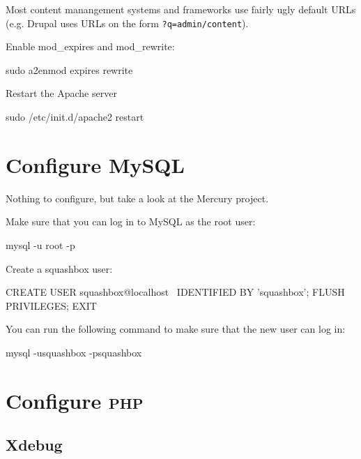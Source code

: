 \documentclass[final,ebook,10pt,twoside,openright]{memoir}
\begin{document}
Most content manangement systems and frameworks use fairly ugly default URLs (e.g. Drupal uses URLs on the form \verb!?q=admin/content!).

Enable mod\_expires and mod\_rewrite:

\begin{squashboxcommand}
sudo a2enmod expires rewrite
\end{squashboxcommand}

Restart the Apache server

\begin{squashboxcommand}
sudo /etc/init.d/apache2 restart
\end{squashboxcommand}

\section{Configure MySQL}
\label{sec:Configure MySQL}

Nothing to configure, but take a look at the Mercury project.

Make sure that you can log in to MySQL as the root user:

\begin{squashboxcommand}
mysql -u root -p
\end{squashboxcommand}

Create a squashbox user:

\begin{squashboxcommand}
CREATE USER squashbox@localhost \
  IDENTIFIED BY 'squashbox';
FLUSH PRIVILEGES;
EXIT
\end{squashboxcommand}

You can run the following command to make sure that the new user can log in:

\begin{squashboxcommand}
mysql -usquashbox -psquashbox
\end{squashboxcommand}

\section{Configure \textsc{php}}
\label{sec:Configure PHP}

\subsection{Xdebug}
\end{document}
